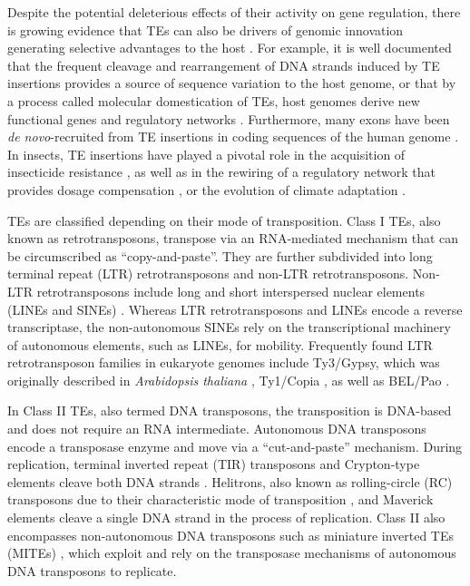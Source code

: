 Despite the potential deleterious effects of their activity on gene
regulation, there is growing evidence that TEs can also be drivers of
genomic innovation generating selective advantages to the host
\citep{Casola2007,Gonzalez2008}. For example, it is well documented that
the frequent cleavage and rearrangement of DNA strands induced by TE
insertions provides a source of sequence variation to the host genome,
or that by a process called molecular domestication of TEs, host genomes
derive new functional genes and regulatory networks
\citep{Feschotte2008,Boehne2008,Santos_2014}.  Furthermore, many exons
have been \emph{de novo}-recruited from TE insertions in coding
sequences of the human genome \citep{Zhang2006}.  In insects, TE
insertions have played a pivotal role in the acquisition of insecticide
resistance \citep{Chen2007,Itokawa2010,Gahan2001}, as well as in the
rewiring of a regulatory network that provides dosage compensation
\citep{Ellison2013}, or the evolution of climate adaptation
\citep{Gonzalez2010,Kim2014}.



TEs are classified depending on their mode of transposition. Class I
TEs, also known as retrotransposons, transpose via an RNA-mediated
mechanism that can be circumscribed as ``copy-and-paste''. They are
further subdivided into long terminal repeat (LTR) retrotransposons and
non-LTR retrotransposons. Non-LTR retrotransposons include long and
short interspersed nuclear elements (LINEs and SINEs)
\citep{Malik1999,Eickbush2008}. Whereas LTR retrotransposons and LINEs
encode a reverse transcriptase, the non-autonomous SINEs rely on the
transcriptional machinery of autonomous elements, such as LINEs, for
mobility. Frequently found LTR retrotransposon families in eukaryote
genomes include Ty3/Gypsy, which was originally described in
\emph{Arabidopsis thaliana} \citep{Marin2000}, Ty1/Copia
\citep{Flavell1992}, as well as BEL/Pao \citep{de_la_Chaux2011}.

In Class II TEs, also termed DNA transposons, the transposition is
DNA-based and does not require an RNA intermediate. Autonomous DNA
transposons encode a transposase enzyme and move via a ``cut-and-paste''
mechanism. During replication, terminal inverted repeat (TIR)
transposons and Crypton-type elements cleave both DNA strands
\citep{Wicker2007}. Helitrons, also known as rolling-circle (RC)
transposons due to their characteristic mode of transposition
\citep{Kapitonov2001}, and Maverick elements \citep{Kapitonov2006}
cleave a single DNA strand in the process of replication. Class II also
encompasses non-autonomous DNA transposons such as miniature inverted
TEs (MITEs) \citep{Shirasawa2012}, which exploit and rely on the
transposase mechanisms of autonomous DNA transposons to replicate.


